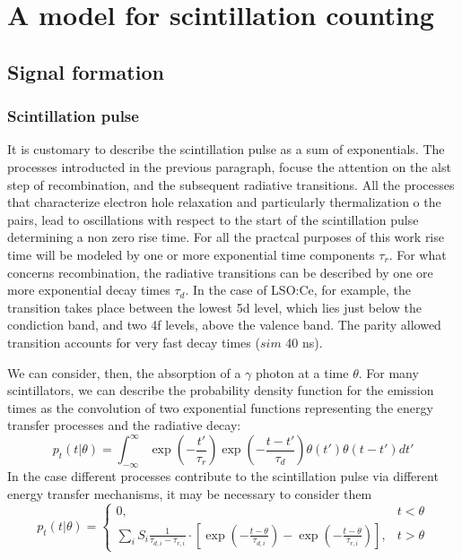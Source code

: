 
\chapter{A model for scintillation counting}


\section{Signal formation}

\subsection{Scintillation pulse}
It is customary to describe \cite{Hyman1963} the scintillation pulse as a sum of exponentials. The processes introducted in the previous paragraph, focuse the attention on the alst step of recombination, and the subsequent radiative transitions. 
All the processes that characterize electron hole relaxation and particularly thermalization o the pairs, lead to oscillations with respect to the start of the scintillation pulse determining a non zero rise time.
For all the practcal purposes of this work rise time will be modeled by one or more exponential time components $\tau _{r}$. 
For what concerns recombination, the radiative transitions can be described by one ore more exponential decay times $\tau _{d}$.
In the case of LSO:Ce, for example, the transition takes place between the lowest 5d level, which lies just below the condiction band, and two 4f levels, above the valence band. The parity allowed transition accounts for very fast decay times ($sim$ 40 ns).

We can consider, then, the absorption of a $\gamma$ photon at a time $\theta$. 
For many scintillators, we can describe the probability density function for the emission times as the convolution of two exponential functions representing the energy transfer processes and the radiative decay\cite{Shao2006}:
\begin{equation}
p_{t}(t|\theta) = \int _{-\infty}^{\infty} \exp{\left( -\frac{t'}{\tau _{r}}\right) } \exp{\left(-\frac{t-t'}{\tau _{d}}\right) } \theta (t') \theta (t-t') dt'
\end{equation}
In the case different processes contribute to the scintillation pulse via different energy transfer mechanisms, it may be necessary to consider them\cite{Seifert2012}
\begin{equation}
p _{t}(t|\theta) = \begin{cases} 0, & t < \theta \\ \sum _{i} S_{i} \frac{1}{\tau _{d, i} - \tau _{r, i}} \cdot \left[ \exp{\left( -\frac{t-\theta}{\tau _{d,i}}\right)} - \exp{\left( -\frac{t-\theta}{\tau _{r,i}}\right) } \right], & t > \theta \end{cases}
\end{equation}

